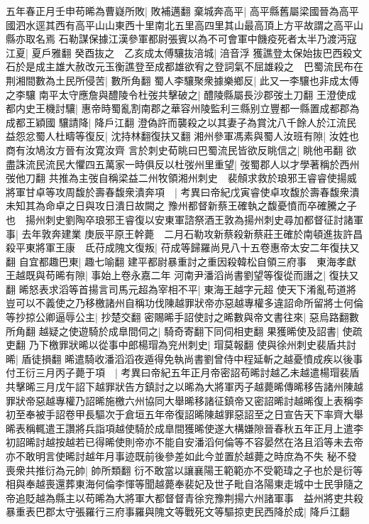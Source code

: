 五年春正月壬申苟晞為曹嶷所敗|{
	敗補邁翻}
棄城奔高平|{
	高平縣舊屬梁國晉為高平國泗水逕其西有高平山山東西十里南北五里高四里其山最高頂上方平故謂之高平山縣亦取名焉}
石勒謀保據江漢參軍都尉張賓以為不可會軍中饑疫死者太半乃渡沔寇江夏|{
	夏戶雅翻}
癸酉抜之　乙亥成太傅驤抜涪城|{
	涪音浮}
獲譙登太保始抜巴西殺文石於是成主雄大赦改元玉衡譙登至成都雄欲宥之登詞氣不屈雄殺之　巴蜀流民布在荆湘間數為土民所侵苦|{
	數所角翻}
蜀人李驤聚衆據樂鄉反|{
	此又一李驤也非成太傅之李驤}
南平太守應詹與醴陵令杜弢共擊破之|{
	醴陵縣屬長沙郡弢土刀翻}
王澄使成都内史王機討驤|{
	惠帝時蜀亂割南郡之華容州陵監利三縣别立豐都一縣置成都郡為成都王穎國}
驤請降|{
	降戶江翻}
澄偽許而襲殺之以其妻子為賞沈八千餘人於江流民益怨忿蜀人杜疇等復反|{
	沈持林翻復扶又翻}
湘州參軍馮素與蜀人汝班有隙|{
	汝姓也商有汝鳩汝方晉有汝寛汝齊}
言於刺史荀眺曰巴蜀流民皆欲反眺信之|{
	眺他弔翻}
欲盡誅流民流民大懼四五萬家一時俱反以杜弢州里重望|{
	弢蜀郡人以才學著稱於西州弢他刀翻}
共推為主弢自稱梁益二州牧領湘州刺史　裴頠求救於琅邪王睿睿使揚威將軍甘卓等攻周馥於壽春馥衆潰奔項　|{
	考異曰帝紀戊寅睿使卓攻馥於壽春馥衆潰未知其為命卓之日與攻日潰日故闕之}
豫州都督新蔡王確執之馥憂憤而卒確騰之子也　揚州刺史劉陶卒琅邪王睿復以安東軍諮祭酒王敦為揚州刺史尋加都督征討諸軍事|{
	去年敦奔建業}
庚辰平原王幹薨　二月石勒攻新蔡殺新蔡莊王確於南頓進抜許昌殺平東將軍王康　氐苻成隗文復叛|{
	苻成等歸羅尚見八十五卷惠帝太安二年復扶又翻}
自宜都趣巴東|{
	趣七喻翻}
建平都尉暴重討之重因殺韓松自領三府事　東海孝獻王越既與苟晞有隙|{
	事始上卷永嘉二年}
河南尹潘滔尚書劉望等復從而譖之|{
	復扶又翻}
晞怒表求滔等首揚言司馬元超為宰相不平|{
	東海王越字元超}
使天下淆亂苟道將豈可以不義使之乃移檄諸州自稱功伐陳越罪狀帝亦惡越專權多違詔命所留將士何倫等抄掠公卿逼辱公主|{
	抄楚交翻}
密賜晞手詔使討之晞數與帝文書往來|{
	惡烏路翻數所角翻}
越疑之使遊騎於成臯間伺之|{
	騎奇寄翻下同伺相吏翻}
果獲晞使及詔書|{
	使疏吏翻}
乃下檄罪狀晞以從事中郎楊瑁為兖州刺史|{
	瑁莫報翻}
使與徐州刺史裴盾共討晞|{
	盾徒損翻}
晞遣騎收潘滔滔夜遁得免執尚書劉曾侍中程延斬之越憂憤成疾以後事付王衍三月丙子薨于項　|{
	考異曰帝紀五年正月帝密詔苟晞討越乙未越遣楊瑁裴盾共擊晞三月戊午詔下越罪狀告方鎮討之以晞為大將軍丙子越薨晞傳晞移告諸州陳越罪狀帝惡越專權乃詔晞施檄六州協同大舉晞移諸征鎮帝又密詔晞討越晞復上表稱李初至奉被手詔卷甲長驅次于倉垣五年帝復詔晞陳越罪惡詔至之日宣告天下率齊大舉晞表稱輒遣王讚將兵詣項越使騎於成臯間獲晞使遂大構嫌隙晉春秋五年正月上遣李初詔晞討越按越若已得晞使則帝亦不能自安潘滔何倫等不容晏然在洛且滔等未去帝亦不敢明言使晞討越年月事迹既前後參差如此今並置於越薨之時庶為不失}
秘不發喪衆共推衍為元帥|{
	帥所類翻}
衍不敢當以讓襄陽王範範亦不受範瑋之子也於是衍等相與奉越喪還葬東海何倫李惲等聞越薨奉裴妃及世子毗自洛陽東走城中士民爭隨之帝追貶越為縣主以苟晞為大將軍大都督督青徐兖豫荆揚六州諸軍事　益州將吏共殺暴重表巴郡太守張羅行三府事羅與隗文等戰死文等驅掠吏民西降於成|{
	降戶江翻}
